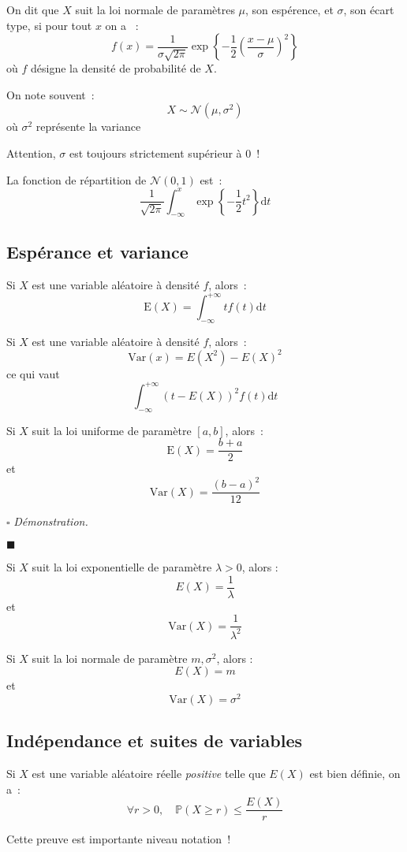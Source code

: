\documentclass[a4paper, titlepage]{article}
\renewenvironment{proof}{$\square$ \footnotesize\textit{Démonstration.}}{\begin{flushright}$\blacksquare$\end{flushright}}
\begin{document}
	\begin{defn}
		On dit que $X$ suit la loi normale de paramètres $\mu$, son espérence, et $\sigma$, son écart type, si pour tout $x$ on a ~:
		$$ f(x) = \frac{1}{\sigma\sqrt{2\pi}}\exp\left\{ -\frac{1}{2}\left( \frac{x-\mu}{\sigma} \right)^2 \right\}  $$
		où $f$ désigne la densité de probabilité de $X$.

		On note souvent~:
		$$ X\sim\mathcal{N}(\mu,\sigma^2) $$
		où $\sigma^2$ représente la variance
	\end{defn}
	Attention, $\sigma$ est toujours strictement supérieur à 0~!

	La fonction de répartition de $\mathcal{N}(0,1)$ est~:
	$$ \frac{1}{\sqrt{2\pi}}\int^x_{-\infty} \exp\left\{ -\frac{1}{2}t^2 \right\} \mathrm{d}t $$
	\subsection{Espérance et variance}
	\begin{defn}[Espérance]
		Si $X$ est une variable aléatoire à densité $f$, alors~:
		$$ \mathrm{E}(X) = \int^{+\infty}_{-\infty} tf(t)\mathrm{d}t $$
	\end{defn}

	\begin{defn}[Variance]
		Si $X$ est une variable aléatoire à densité $f$, alors~:
		$$ \mathrm{Var}(x) = E(X^2)-E(X)^2 $$
		ce qui vaut
		$$ \int^{+\infty}_{-\infty}(t-E(X))^2f(t)\mathrm{d}t $$
	\end{defn}

	\begin{thm}
		Si $X$ suit la loi uniforme de paramètre $[a,b]$, alors~:
		$$ \mathrm{E}(X) = \frac{b+a}{2} $$
		et
		$$ \mathrm{Var}(X) = \frac{(b-a)^2}{12} $$
	\end{thm}
	\begin{proof}
		\AQT
	\end{proof}

	\begin{thm}
		Si $X$ suit la loi exponentielle de paramètre $\lambda > 0$, alors :
		$$ E(X) = \frac{1}{\lambda} $$
		et
		$$ \mathrm{Var}(X) = \frac{1}{\lambda^2} $$
	\end{thm}

	\begin{thm}
		Si $X$ suit la loi normale de paramètre $m,\sigma^2$, alors :
		$$ E(X) = m $$
		et
		$$ \mathrm{Var}(X) = \sigma^2 $$
	\end{thm}

	\subsection{Indépendance et suites de variables}
	\begin{thm}
		Si $X$ est une variable aléatoire réelle \textit{positive} telle que $E(X)$ est bien définie, on a~:
		$$ \forall r>0,\quad \mathbb{P}(X\geqslant r)\leqslant \frac{E(X)}{r} $$
	\end{thm}
	Cette preuve est importante niveau notation~!
\end{document}
